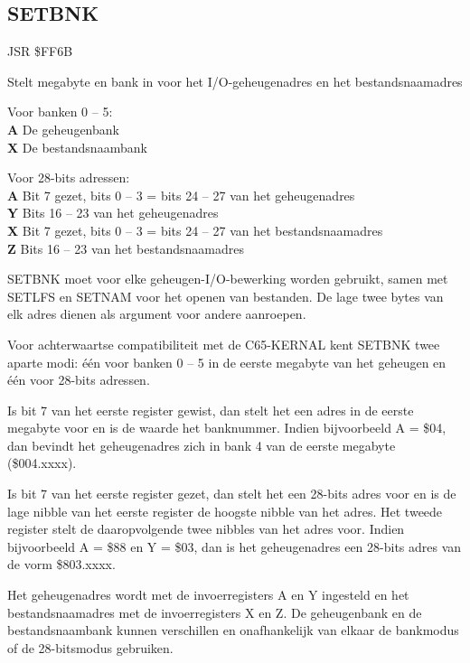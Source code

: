 \subsection{SETBNK}
\label{KERNAL Jump Table!SETBNK}
\begin{description}[leftmargin=2cm,style=nextline]
    \item [Adres:] JSR \$FF6B    \item [Omschrijving:] Stelt megabyte en bank in voor het I/O-geheugenadres en het bestandsnaamadres    \item [Invoer:]        Voor banken 0 -- 5: \\        \textbf{A} De geheugenbank \\        \textbf{X} De bestandsnaambank

        Voor 28-bits adressen: \\        \textbf{A} Bit 7 gezet, bits 0 -- 3 = bits 24 -- 27 van het geheugenadres \\        \textbf{Y} Bits 16 -- 23 van het geheugenadres \\        \textbf{X} Bit 7 gezet, bits 0 -- 3 = bits 24 -- 27 van het bestandsnaamadres \\        \textbf{Z} Bits 16 -- 23 van het bestandsnaamadres    \item [Opmerkingen:]        SETBNK moet voor elke geheugen-I/O-bewerking worden gebruikt, samen met SETLFS en SETNAM voor het openen van bestanden. De lage twee bytes van elk adres dienen als argument voor andere aanroepen.

        Voor achterwaartse compatibiliteit met de C65-KERNAL kent SETBNK twee aparte modi: één voor banken 0 -- 5 in de eerste megabyte van het geheugen en één voor 28-bits adressen.

        Is bit 7 van het eerste register gewist, dan stelt het een adres in de eerste megabyte voor en is de waarde het banknummer. Indien bijvoorbeeld A = \$04, dan bevindt het geheugenadres zich in bank 4 van de eerste megabyte (\$004.xxxx).

        Is bit 7 van het eerste register gezet, dan stelt het een 28-bits adres voor en is de lage nibble van het eerste register de hoogste nibble van het adres. Het tweede register stelt de daaropvolgende twee nibbles van het adres voor. Indien bijvoorbeeld A = \$88 en Y = \$03, dan is het geheugenadres een 28-bits adres van de vorm \$803.xxxx.

        Het geheugenadres wordt met de invoerregisters A en Y ingesteld en het bestandsnaamadres met de invoerregisters X en Z. De geheugenbank en de bestandsnaambank kunnen verschillen en onafhankelijk van elkaar de bankmodus of de 28-bitsmodus gebruiken.


\end{description}
